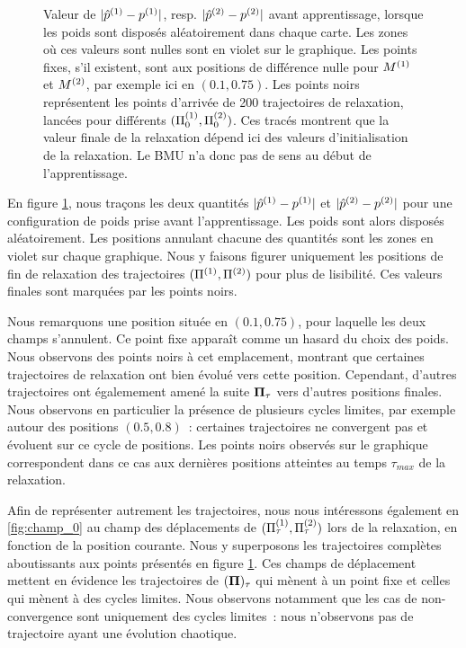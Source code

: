 \documentclass[../main]{subfiles}
\begin{document}
\begin{figure}
\begin{minipage}{0.5\textwidth}
	\end{minipage}
	\caption{Valeur de $\lvert {\hat{p}}^{({1})} - p^{({1})} \rvert $, resp. $\lvert {\hat{p}}^{({2})} - p^{({2})} \rvert$ avant apprentissage, lorsque les poids sont disposés aléatoirement dans chaque carte.
	Les zones où ces valeurs sont nulles sont en violet sur le graphique. Les points fixes, s'il existent, sont aux positions de différence nulle pour $M^{({1})}$ et $M^{({2})}$, par exemple ici en $(0.1, 0.75)$.
	Les points noirs représentent les points d'arrivée de 200 trajectoires de relaxation, lancées pour différents $(\Pi_0^{({1})}, \Pi_0^{({2})})$.
	Ces tracés montrent que la valeur finale de la relaxation dépend ici des valeurs d'initialisation de la relaxation. Le BMU n'a donc pas de sens au début de l'apprentissage. \label{fig:diff_relax_t1_notraj}}
	\end{figure}

En figure \ref{fig:diff_relax_t1_notraj}, nous traçons les deux quantités $\lvert \hat{p}^{({1})} - p^{({1})} \rvert$ et $\lvert \hat{p}^{({2})} - p^{({2})}\rvert$ pour une configuration de poids prise avant l'apprentissage. Les poids sont alors disposés aléatoirement.
Les positions annulant chacune des quantités sont les zones en violet sur chaque graphique.
Nous y faisons figurer uniquement les positions de fin de relaxation des trajectoires $(\Pi^{({1})},\Pi^{({2})})$ pour plus de lisibilité. Ces valeurs finales sont marquées par les points noirs.

Nous remarquons une position située en $(0.1, 0.75)$, pour laquelle les deux champs s'annulent. Ce point fixe apparaît comme un hasard du choix des poids.
Nous observons des points noirs à cet emplacement, montrant que certaines trajectoires de relaxation ont bien évolué vers cette position. 
Cependant, d'autres trajectoires ont égalemement amené la suite $\mathbf{\Pi}_\tau$ vers d'autres positions finales.
Nous observons en particulier la présence de plusieurs cycles limites, par exemple autour des positions $(0.5, 0.8)$~: certaines trajectoires ne convergent pas et évoluent sur ce cycle de positions. Les points noirs observés sur le graphique correspondent dans ce cas aux dernières positions atteintes au temps $\tau_{max}$ de la relaxation.

Afin de représenter autrement les trajectoires, nous nous intéressons également en \ref{fig:champ_0} au champ des déplacements de $(\Pi^{({1})}_\tau,\Pi^{({2})}_\tau)$ lors de la relaxation, en fonction de la position courante. 
Nous y superposons les trajectoires complètes aboutissants aux points présentés en figure \ref{fig:diff_relax_t1_notraj}.
Ces champs de déplacement mettent en évidence les trajectoires de $(\mathbf{\Pi})_\tau$ qui mènent à un point fixe et celles qui mènent à des cycles limites.
Nous observons notamment que les cas de non-convergence sont uniquement des cycles limites~: nous n'observons pas de trajectoire ayant une évolution chaotique.
\end{document}
